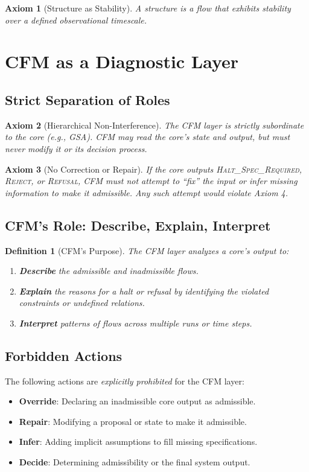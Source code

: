 \documentclass{article}
\newtheorem{definition}{Definition}[section]
\newtheorem{axiom}{Axiom}[section]
\begin{document}
\begin{axiom}[Structure as Stability]
A structure is a flow that exhibits stability over a defined observational timescale.
\end{axiom}

\section{CFM as a Diagnostic Layer}

\subsection{Strict Separation of Roles}
\begin{axiom}[Hierarchical Non-Interference]
The CFM layer is strictly subordinate to the core (e.g., GSA). CFM may read the core's state and output, but must never modify it or its decision process.
\end{axiom}

\begin{axiom}[No Correction or Repair]
If the core outputs \textsc{Halt\_Spec\_Required}, \textsc{Reject}, or \textsc{Refusal}, CFM must not attempt to ``fix'' the input or infer missing information to make it admissible. Any such attempt would violate Axiom 4.
\end{axiom}

\subsection{CFM's Role: Describe, Explain, Interpret}
\begin{definition}[CFM's Purpose]
The CFM layer analyzes a core's output to:
\begin{enumerate}
\item \textbf{Describe} the admissible and inadmissible flows.
\item \textbf{Explain} the reasons for a halt or refusal by identifying the violated constraints or undefined relations.
\item \textbf{Interpret} patterns of flows across multiple runs or time steps.
\end{enumerate}
\end{definition}

\subsection{Forbidden Actions}
The following actions are \emph{explicitly prohibited} for the CFM layer:
\begin{itemize}
\item \textbf{Override}: Declaring an inadmissible core output as admissible.
\item \textbf{Repair}: Modifying a proposal or state to make it admissible.
\item \textbf{Infer}: Adding implicit assumptions to fill missing specifications.
\item \textbf{Decide}: Determining admissibility or the final system output.
\end{itemize}
\end{document}
